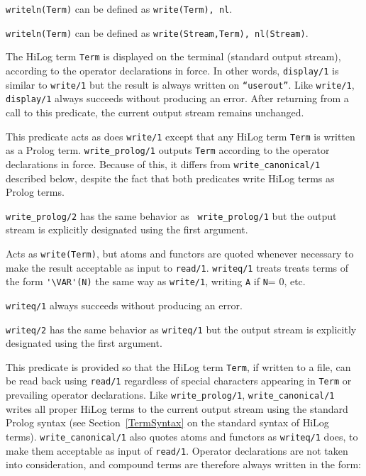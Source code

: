 \begin{description}
    {\tt writeln(Term)} can be defined as {\tt write(Term), nl}.

    {\tt writeln(Term)} can be defined as {\tt write(Stream,Term),
    nl(Stream)}.

    The HiLog term {\tt Term} is displayed on the terminal (standard output 
    stream), according to the operator declarations in force. In other words,
    {\tt display/1} is similar to {\tt write/1} but the result is always
    written on {\tt ``userout''}\@.  Like {\tt write/1}, {\tt display/1} 
    always succeeds without producing an error. After returning from a call 
    to this predicate, the current output stream remains unchanged.

    This predicate acts as does {\tt write/1} except that
    any HiLog term {\tt Term} is written as a Prolog term. 
    {\tt write\_prolog/1} outputs {\tt Term} according to the operator 
    declarations
    in force.  Because of this, it differs from {\tt write\_canonical/1} 
    described below, despite the fact that both predicates write HiLog terms
    as Prolog terms.

	{\tt write\_prolog/2} has the same behavior as {\tt
	write\_prolog/1} but the output stream is explicitly
	designated using the first argument.

    Acts as {\tt write(Term)}, but atoms and functors are quoted
    whenever necessary to make the result acceptable as input to 
    {\tt read/1}\@. {\tt writeq/1} treats treats terms of the form 
    \verb|'\VAR'(N)| the same way as {\tt write/1}, writing {\tt A} if
    {\tt N}= 0, etc. 

    {\tt writeq/1} always succeeds without producing an error.

	{\tt writeq/2} has the same behavior as {\tt writeq/1} but the
	output stream is explicitly designated using the first argument.

    This predicate is provided so that the HiLog term {\tt Term}, 
    if written to a file, can be read back using {\tt read/1} regardless of 
    special characters appearing in {\tt Term} or prevailing operator 
    declarations. Like {\tt write\_prolog/1}, {\tt write\_canonical/1} 
    writes all proper HiLog terms to the current output stream using the 
    standard Prolog syntax (see Section~\ref{TermSyntax} on the standard 
    syntax of HiLog terms). {\tt write\_canonical/1} also quotes atoms and 
    functors as {\tt writeq/1} does, to make them acceptable as input of 
    {\tt read/1}\@.  Operator declarations are not taken into consideration,
    and compound terms are therefore always written in the form:


\end{description}
